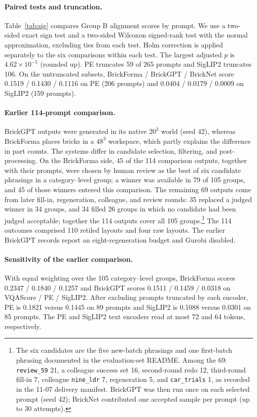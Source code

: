 \documentclass[letterpaper]{article} %
\begin{document}
\paragraph{Paired tests and truncation.}
Table~\ref{tab:sig} compares Group B alignment scores by prompt. We use a two-sided exact sign test and a two-sided Wilcoxon signed-rank test with the normal approximation, excluding ties from each test. Holm correction is applied separately to the six comparisons within each test. The largest adjusted $p$ is $4.62{\times}10^{-5}$ (rounded up). PE truncates 59 of 265 prompts and SigLIP2 truncates 106. On the untruncated subsets, BrickForma / BrickGPT / BrickNet score 0.1519 / 0.1430 / 0.1116 on PE (206 prompts) and 0.0404 / 0.0179 / 0.0009 on SigLIP2 (159 prompts).


\paragraph{Earlier 114-prompt comparison.} BrickGPT outputs were generated in its native $20^3$ world (seed 42), whereas BrickForma places bricks in a $48^3$ workspace, which partly explains the difference in part counts.
The systems differ in candidate selection, filtering, and post-processing.
On the BrickForma side, 45 of the 114 comparison outputs, together with their prompts, were chosen by human review as the best of six candidate phrasings in a category--level group; a winner was available in 79 of 105 groups, and 45 of those winners entered this comparison.
The remaining 69 outputs come from later fill-in, regeneration, colleague, and review rounds: 35 replaced a judged winner in 34 groups, and 34 filled 26 groups in which no candidate had been judged acceptable; together the 114 outputs cover all 105 groups.\footnote{The six candidates are the five new-batch phrasings and one first-batch phrasing documented in the evaluation-set README. Among the 69: \texttt{review\_59} 21, a colleague success set 16, second-round redo 12, third-round fill-in 7, colleague \texttt{nine\_ldr} 7, regeneration 5, and \texttt{car\_trials} 1, as recorded in the 11-07 delivery manifest. BrickGPT was then run once on each selected prompt (seed 42); BrickNet contributed one accepted sample per prompt (up to 30 attempts).}
The 114 outcomes comprised 110 retiled layouts and four raw layouts. The earlier BrickGPT records report an eight-regeneration budget and Gurobi disabled.

\paragraph{Sensitivity of the earlier comparison.}
With equal weighting over the 105 category--level groups, BrickForma scores 0.2347 / 0.1840 / 0.1257 and BrickGPT scores 0.1511 / 0.1459 / 0.0318 on VQAScore / PE / SigLIP2. After excluding prompts truncated by each encoder, PE is 0.1821 versus 0.1445 on 89 prompts and SigLIP2 is 0.1088 versus 0.0301 on 85 prompts. The PE and SigLIP2 text encoders read at most 72 and 64 tokens, respectively.
\end{document}
